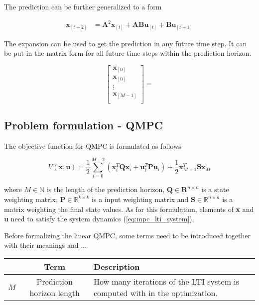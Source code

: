 The prediction can be further generalized to a form

\begin{equation}
\begin{split}
\textbf{x}_{[t+2]} &= \textbf{A}^2\textbf{x}_{[t]} + \textbf{A}\textbf{B}\textbf{u}_{[t]} + \textbf{B}\textbf{u}_{[t+1]}
\end{split}
\end{equation}

The expansion can be used to get the prediction in any future time step. It can be put in the matrix form for all future time steps within the prediction horizon.

\begin{equation}
\begin{bmatrix}
\textbf{x}_{[0]} \\
\textbf{x}_{[0]} \\
\vdots \\
\textbf{x}_{[M-1]} \\
\end{bmatrix}
=
\end{equation}

\subsection{Problem formulation - QMPC}


The objective function for QMPC is formulated as follows

\begin{equation}
V\left(\textbf{x}, \textbf{u}\right) = \frac{1}{2}\sum_{i=0}^{M-2}\left(\textbf{x}^T_i\textbf{Q}\textbf{x}_i + \textbf{u}^T_i\textbf{P}\textbf{u}_i\right) + \frac{1}{2}\textbf{x}^T_{M-1}\textbf{S}\textbf{x}_M
\end{equation}

where $M \in \mathbb{N}$ is the length of the prediction horizon, $\textbf{Q} \in \textbf{R}^{n\times n}$ is a state weighting matrix, $\textbf{P} \in \mathbb{R}^{k\times k}$ is a input weighting matrix and $\textbf{S} \in \mathbb{R}^{n \times n}$ is a matrix weighting the final state values. As for this formulation, elements of \textbf{x} and \textbf{u} need to satisfy the system dynamics (\ref{eq:mpc_lti_system}).

Before formalizing the linear QMPC, some terms need to be introduced together with their meanings and ... 

\begin{table}[h]
\begin{tabular}{ccl}
\hline
& Term & Description \\
\hline
$M$ & Prediction horizon length & \parbox[t]{9.65cm} {How many iterations of the LTI system is computed with in the optimization.} \\
\hline
\end{tabular}
\end{table}



